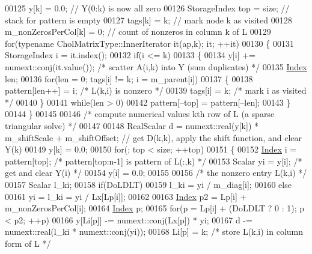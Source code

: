 \begin{DoxyCode}
00125     y[k] = 0.0;                     \textcolor{comment}{// Y(0:k) is now all zero}
00126     StorageIndex top = size;               \textcolor{comment}{// stack for pattern is empty}
00127     tags[k] = k;                    \textcolor{comment}{// mark node k as visited}
00128     m\_nonZerosPerCol[k] = 0;        \textcolor{comment}{// count of nonzeros in column k of L}
00129     \textcolor{keywordflow}{for}(\textcolor{keyword}{typename} CholMatrixType::InnerIterator it(ap,k); it; ++it)
00130     \{
00131       StorageIndex i = it.index();
00132       \textcolor{keywordflow}{if}(i <= k)
00133       \{
00134         y[i] += numext::conj(it.value());            \textcolor{comment}{/* scatter A(i,k) into Y (sum duplicates) */}
00135         \hyperlink{namespace_eigen_a62e77e0933482dafde8fe197d9a2cfde}{Index} len;
00136         \textcolor{keywordflow}{for}(len = 0; tags[i] != k; i = m\_parent[i])
00137         \{
00138           pattern[len++] = i;     \textcolor{comment}{/* L(k,i) is nonzero */}
00139           tags[i] = k;            \textcolor{comment}{/* mark i as visited */}
00140         \}
00141         \textcolor{keywordflow}{while}(len > 0)
00142           pattern[--top] = pattern[--len];
00143       \}
00144     \}
00145 
00146     \textcolor{comment}{/* compute numerical values kth row of L (a sparse triangular solve) */}
00147 
00148     RealScalar d = numext::real(y[k]) * m\_shiftScale + m\_shiftOffset;    \textcolor{comment}{// get D(k,k), apply the shift
       function, and clear Y(k)}
00149     y[k] = 0.0;
00150     \textcolor{keywordflow}{for}(; top < size; ++top)
00151     \{
00152       \hyperlink{namespace_eigen_a62e77e0933482dafde8fe197d9a2cfde}{Index} i = pattern[top];       \textcolor{comment}{/* pattern[top:n-1] is pattern of L(:,k) */}
00153       Scalar yi = y[i];             \textcolor{comment}{/* get and clear Y(i) */}
00154       y[i] = 0.0;
00155 
00156       \textcolor{comment}{/* the nonzero entry L(k,i) */}
00157       Scalar l\_ki;
00158       \textcolor{keywordflow}{if}(DoLDLT)
00159         l\_ki = yi / m\_diag[i];
00160       \textcolor{keywordflow}{else}
00161         yi = l\_ki = yi / Lx[Lp[i]];
00162 
00163       \hyperlink{namespace_eigen_a62e77e0933482dafde8fe197d9a2cfde}{Index} p2 = Lp[i] + m\_nonZerosPerCol[i];
00164       \hyperlink{namespace_eigen_a62e77e0933482dafde8fe197d9a2cfde}{Index} p;
00165       \textcolor{keywordflow}{for}(p = Lp[i] + (DoLDLT ? 0 : 1); p < p2; ++p)
00166         y[Li[p]] -= numext::conj(Lx[p]) * yi;
00167       d -= numext::real(l\_ki * numext::conj(yi));
00168       Li[p] = k;                          \textcolor{comment}{/* store L(k,i) in column form of L */}

\end{DoxyCode}
